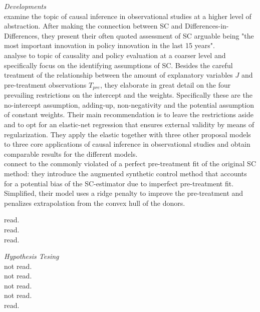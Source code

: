 \textit{Developments}\\
\cite{athey:2016} examine the topic of causal inference in observational studies at a higher level of abstraction. After making the connection between \ac{SC}  and Differences-in-Differences, they present their often quoted assessment of \ac{SC} arguable being "the most important innovation in policy innovation in the last 15 years". \\
\cite{doudchenko:2016} analyse to topic of causality and policy evaluation at a coarser level and specifically focus on the identifying assumptions of \ac{SC}. Besides the careful treatment of the relationship between the amount of explanatory variables $J$ and pre-treatment observations $T_{pre}$, they elaborate in great detail on the four prevailing restrictions on the intercept and the weights. Specifically these are the no-intercept assumption, adding-up, non-negativity and the potential assumption of constant weights. Their main recommendation is to leave the restrictions aside and to opt for an elastic-net regression that ensures external validity by means of regularization. They apply the elastic together with three other proposal models to three core applications of causal inference in observational studies and obtain comparable results for the different models. \\
\cite{benmichael:2021a} connect to the commonly violated of a perfect pre-treatment fit of the original \ac{SC} method: they introduce the augmented synthetic control method that accounts for a potential bias of the \ac{SC}-estimator due to imperfect pre-treatment fit. Simplified, their model uses a ridge penalty to improve the pre-treatment and penalizes extrapolation from the convex hull of the donors.

\cite{abadie:2019}
\cite{amjad:2018} read.\\
\cite{harvey:2020} read.\\
\cite{muhlbach:2019}
 read.

\textit{Hypothesis Tesing}\\
\cite{andrews:2003} not read. \\
\cite{chernozhukov:2019} not read.\\
\cite{chernozhukov:2021} not read. \\
\cite{firpo:2018} not read. \\
\cite{hahn:2017} read.\\
\cite{breitung:2021}







